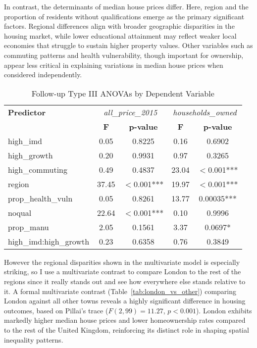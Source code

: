 \documentclass[12pt]{article}
\begin{document}
In contrast, the determinants of median house prices differ. Here, region and the proportion of residents without qualifications emerge as the primary significant factors. Regional differences align with broader geographic disparities in the housing market, while lower educational attainment may reflect weaker local economies that struggle to sustain higher property values. Other variables such as commuting patterns and health vulnerability, though important for ownership, appear less critical in explaining variations in median house prices when considered independently.


\begin{table}[htbp]
\centering
\caption{Follow-up Type III ANOVAs by Dependent Variable}
\label{tab:anova_summary}
\begin{tabular}{lcc|cc}
\hline
\textbf{Predictor} & \multicolumn{2}{c|}{\textit{all\_price\_2015}} & \multicolumn{2}{c}{\textit{households\_owned}} \\
 & \textbf{F} & \textbf{p-value} & \textbf{F} & \textbf{p-value} \\
\hline
high\_imd & 0.05 & 0.8225 & 0.16 & 0.6902 \\
high\_growth & 0.20 & 0.9931 & 0.97 & 0.3265 \\
high\_commuting & 0.49 & 0.4837 & 23.04 & $<$0.001*** \\
region & 37.45 & $<$0.001*** & 19.97 & $<$0.001*** \\
prop\_health\_vuln & 0.05 & 0.8261 & 13.77 & 0.00035*** \\
noqual & 22.64 & $<$0.001*** & 0.10 & 0.9996 \\
prop\_manu & 2.05 & 0.1561 & 3.37 & 0.0697* \\
high\_imd:high\_growth & 0.23 & 0.6358 & 0.76 & 0.3849 \\
\hline
\end{tabular}
\end{table}

However the regional disparities shown in the multivariate model is especially striking, so I use a multivariate contrast to compare London to the rest of the regions since it really stands out and see how everywhere else stands relative to it. A formal multivariate contrast (Table~\ref{tab:london_vs_other}) comparing London against all other towns reveals a highly significant difference in housing outcomes, based on Pillai’s trace ($F(2, 99) = 11.27$, $p < 0.001$). London exhibits markedly higher median house prices and lower homeownership rates compared to the rest of the United Kingdom, reinforcing its distinct role in shaping spatial inequality patterns.
\end{document}

